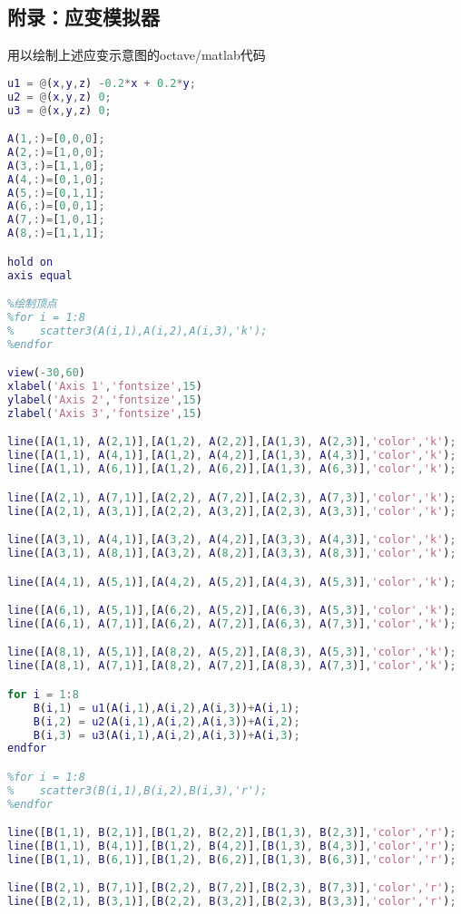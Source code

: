\subsection{附录：应变模拟器}
用以绘制上述应变示意图的octave/matlab代码
\begin{lstlisting}[language=matlab]
%定义位移函数，你可以设置自己的线性位移函数
u1 = @(x,y,z) -0.2*x + 0.2*y;
u2 = @(x,y,z) 0;
u3 = @(x,y,z) 0;

A(1,:)=[0,0,0];
A(2,:)=[1,0,0];
A(3,:)=[1,1,0];
A(4,:)=[0,1,0];
A(5,:)=[0,1,1];
A(6,:)=[0,0,1];
A(7,:)=[1,0,1];
A(8,:)=[1,1,1];

hold on
axis equal

%绘制顶点
%for i = 1:8
%    scatter3(A(i,1),A(i,2),A(i,3),'k');
%endfor

view(-30,60)
xlabel('Axis 1','fontsize',15)
ylabel('Axis 2','fontsize',15)
zlabel('Axis 3','fontsize',15)

line([A(1,1), A(2,1)],[A(1,2), A(2,2)],[A(1,3), A(2,3)],'color','k');
line([A(1,1), A(4,1)],[A(1,2), A(4,2)],[A(1,3), A(4,3)],'color','k');
line([A(1,1), A(6,1)],[A(1,2), A(6,2)],[A(1,3), A(6,3)],'color','k');

line([A(2,1), A(7,1)],[A(2,2), A(7,2)],[A(2,3), A(7,3)],'color','k');
line([A(2,1), A(3,1)],[A(2,2), A(3,2)],[A(2,3), A(3,3)],'color','k');

line([A(3,1), A(4,1)],[A(3,2), A(4,2)],[A(3,3), A(4,3)],'color','k');
line([A(3,1), A(8,1)],[A(3,2), A(8,2)],[A(3,3), A(8,3)],'color','k');

line([A(4,1), A(5,1)],[A(4,2), A(5,2)],[A(4,3), A(5,3)],'color','k');

line([A(6,1), A(5,1)],[A(6,2), A(5,2)],[A(6,3), A(5,3)],'color','k');
line([A(6,1), A(7,1)],[A(6,2), A(7,2)],[A(6,3), A(7,3)],'color','k');

line([A(8,1), A(5,1)],[A(8,2), A(5,2)],[A(8,3), A(5,3)],'color','k');
line([A(8,1), A(7,1)],[A(8,2), A(7,2)],[A(8,3), A(7,3)],'color','k');

for i = 1:8
    B(i,1) = u1(A(i,1),A(i,2),A(i,3))+A(i,1);
    B(i,2) = u2(A(i,1),A(i,2),A(i,3))+A(i,2);
    B(i,3) = u3(A(i,1),A(i,2),A(i,3))+A(i,3);
endfor

%for i = 1:8
%    scatter3(B(i,1),B(i,2),B(i,3),'r');
%endfor

line([B(1,1), B(2,1)],[B(1,2), B(2,2)],[B(1,3), B(2,3)],'color','r');
line([B(1,1), B(4,1)],[B(1,2), B(4,2)],[B(1,3), B(4,3)],'color','r');
line([B(1,1), B(6,1)],[B(1,2), B(6,2)],[B(1,3), B(6,3)],'color','r');

line([B(2,1), B(7,1)],[B(2,2), B(7,2)],[B(2,3), B(7,3)],'color','r');
line([B(2,1), B(3,1)],[B(2,2), B(3,2)],[B(2,3), B(3,3)],'color','r');


\end{lstlisting}
